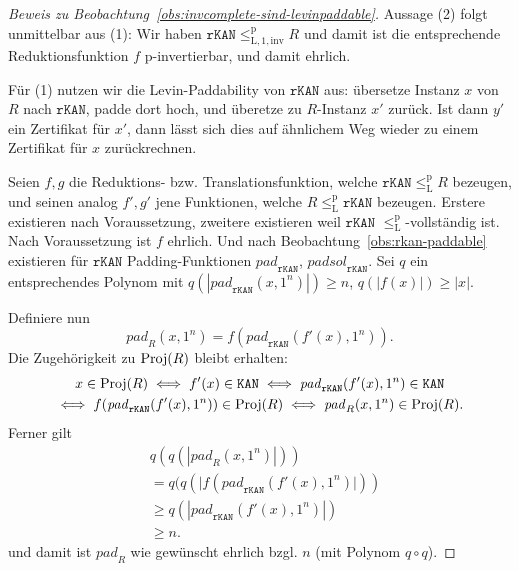 \begin{proof}[Beweis zu Beobachtung~\ref{obs:invcomplete-sind-levinpaddable}]
    Aussage (2) folgt unmittelbar aus (1): Wir haben $\mathtt{rKAN}\leq_\mathrm{L,1,inv}^\mathrm{p} R$ und damit ist die entsprechende Reduktionsfunktion $f$ p-invertierbar, und damit ehrlich.

    Für (1) nutzen wir die Levin-Paddability von $\mathtt{rKAN}$ aus: übersetze Instanz $x$ von $R$ nach $\mathtt{rKAN}$, padde dort hoch, und überetze zu $R$-Instanz $x'$ zurück. Ist dann $y'$ ein Zertifikat für $x'$, dann lässt sich dies auf ähnlichem Weg wieder zu einem Zertifikat für $x$ zurückrechnen.

    Seien $f, g$ die Reduktions- bzw. Translationsfunktion, welche $\mathtt{rKAN}\leq_\mathrm{L}^\mathrm p R$ bezeugen, und seinen analog $f', g'$ jene Funktionen, welche $R\leq_\mathrm{L}^\mathrm p \mathtt{rKAN}$ bezeugen. Erstere existieren nach Voraussetzung, zweitere existieren weil $\mathtt{rKAN}$ $\leq_\mathrm{L}^\mathrm p$-vollständig ist.
    Nach Voraussetzung ist $f$ ehrlich. %
    Und nach Beobachtung~\ref{obs:rkan-paddable} existieren für $\mathtt{rKAN}$ Padding-Funktionen $\mathit{pad}_\mathtt{rKAN}$, $\mathit{padsol}_\mathtt{rKAN}$.
    Sei $q$ ein entsprechendes Polynom mit $q(|\mathit{pad}_\mathtt{rKAN}(x, 1^n)|)\geq n$, $q(|f(x)|) \geq |x|$.

    Definiere nun
    \[ \mathit{pad}_R(x, 1^n) = f(\mathit{pad}_\mathtt{rKAN}(f'(x), 1^n)). \]
    Die Zugehörigkeit zu $\operatorname{Proj}(R)$ bleibt erhalten:
    \begin{multline*}
        x\in \operatorname{Proj}(R) \iff f'(x) \in \mathtt{KAN} \iff \mathit{pad}_\mathtt{rKAN}(f'(x), 1^n) \in \mathtt{KAN}\\ \iff f(\mathit{pad}_\mathtt{rKAN}(f'(x), 1^n)) \in \operatorname{Proj}(R) \iff \mathit{pad}_R(x, 1^n) \in\operatorname{Proj}(R).
    \end{multline*}
    Ferner gilt
    \begin{align*} &q(q(|\mathit{pad}_R(x, 1^n)|)) \\&= q(q(|f(\mathit{pad}_\mathtt{rKAN}(f'(x), 1^n)|))\\&\geq q(|\mathit{pad}_\mathtt{rKAN}(f'(x), 1^n)|)\\ &\geq n.
    \end{align*}
    und damit ist $\mathit{pad}_R$ wie gewünscht ehrlich bzgl. $n$ (mit Polynom $q\circ q$).


\end{proof}
